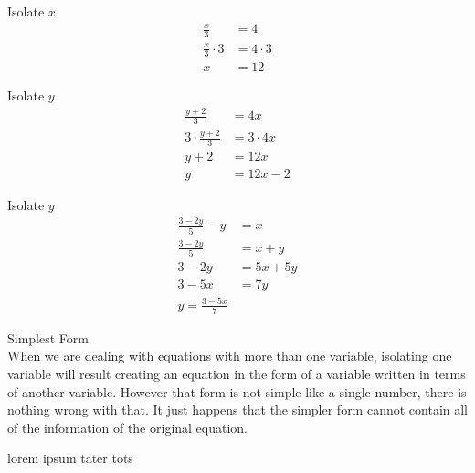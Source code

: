 \documentclass{book}
\begin{document}
  {\example Isolate $x$ \\
    \begin{align*}
      \frac{x}{3} & = 4\\
      \frac{x}{3} \cdot 3 & = 4 \cdot 3\\
      x & = 12
    \end{align*}
  }

  {\example Isolate $y$ \\
    \begin{align*}
      \frac{y + 2}{3} & = 4x\\
      3 \cdot \frac{y + 2}{3} & = 3 \cdot 4x\\
      y + 2 & = 12x\\
      y & = 12x - 2
    \end{align*}
  }

  {\example Isolate $y$ \\
    \begin{align*}
      \frac{3 - 2y}{5} - y & = x\\
      \frac{3 - 2y}{5} & = x + y\\
      3 - 2y & = 5x + 5y\\
      3 - 5x & = 7y\\
      y = \frac{3 - 5x}{7}
    \end{align*}
  }

  {\remark Simplest Form \\
    When we are dealing with equations with more than one variable, isolating one variable will result creating an equation in the form of a variable written in terms of another variable. However that form is not simple like a single number, there is nothing wrong with that. It just happens that the simpler form cannot contain all of the information of the original equation.
  }

  \pagebreak

  {\remark lorem ipsum tater tots

  }
\end{document}
